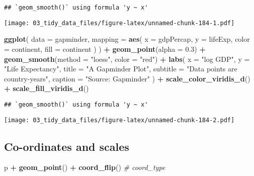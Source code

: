 \documentclass[
]{book}
\newenvironment{Shaded}{\begin{snugshade}}{\end{snugshade}}
\newcommand{\CommentTok}[1]{\textcolor[rgb]{0.56,0.35,0.01}{\textit{#1}}}
\newcommand{\DataTypeTok}[1]{\textcolor[rgb]{0.13,0.29,0.53}{#1}}
\newcommand{\FloatTok}[1]{\textcolor[rgb]{0.00,0.00,0.81}{#1}}
\newcommand{\KeywordTok}[1]{\textcolor[rgb]{0.13,0.29,0.53}{\textbf{#1}}}
\newcommand{\NormalTok}[1]{#1}
\newcommand{\OperatorTok}[1]{\textcolor[rgb]{0.81,0.36,0.00}{\textbf{#1}}}
\newcommand{\StringTok}[1]{\textcolor[rgb]{0.31,0.60,0.02}{#1}}
\begin{document}
\begin{verbatim}
## `geom_smooth()` using formula 'y ~ x'
\end{verbatim}

\texttt{[image: 03\_tidy\_data\_files/figure-latex/unnamed-chunk-184-1.pdf]}

\begin{Shaded}
\begin{Highlighting}[]
\KeywordTok{ggplot}\NormalTok{(}
  \DataTypeTok{data =}\NormalTok{ gapminder,}
  \DataTypeTok{mapping =} \KeywordTok{aes}\NormalTok{(}
    \DataTypeTok{x =}\NormalTok{ gdpPercap, }\DataTypeTok{y =}\NormalTok{ lifeExp,}
    \DataTypeTok{color =}\NormalTok{ continent,}
    \DataTypeTok{fill =}\NormalTok{ continent}
\NormalTok{  )}
\NormalTok{) }\OperatorTok{+}
\StringTok{  }\KeywordTok{geom\_point}\NormalTok{(}\DataTypeTok{alpha =} \FloatTok{0.3}\NormalTok{) }\OperatorTok{+}
\StringTok{  }\KeywordTok{geom\_smooth}\NormalTok{(}\DataTypeTok{method =} \StringTok{"loess"}\NormalTok{, }\DataTypeTok{color =} \StringTok{"red"}\NormalTok{) }\OperatorTok{+}
\StringTok{  }\KeywordTok{labs}\NormalTok{(}
    \DataTypeTok{x =} \StringTok{"log GDP"}\NormalTok{,}
    \DataTypeTok{y =} \StringTok{"Life Expectancy"}\NormalTok{,}
    \DataTypeTok{title =} \StringTok{"A Gapminder Plot"}\NormalTok{,}
    \DataTypeTok{subtitle =} \StringTok{"Data points are country{-}years"}\NormalTok{,}
    \DataTypeTok{caption =} \StringTok{"Source: Gapminder"}
\NormalTok{  ) }\OperatorTok{+}
\StringTok{  }\KeywordTok{scale\_color\_viridis\_d}\NormalTok{() }\OperatorTok{+}
\StringTok{  }\KeywordTok{scale\_fill\_viridis\_d}\NormalTok{()}
\end{Highlighting}
\end{Shaded}

\begin{verbatim}
## `geom_smooth()` using formula 'y ~ x'
\end{verbatim}

\texttt{[image: 03\_tidy\_data\_files/figure-latex/unnamed-chunk-184-2.pdf]}

\hypertarget{co-ordinates-and-scales}{%
\subsection{Co-ordinates and scales}\label{co-ordinates-and-scales}}

\begin{Shaded}
\begin{Highlighting}[]
\NormalTok{p }\OperatorTok{+}\StringTok{ }\KeywordTok{geom\_point}\NormalTok{() }\OperatorTok{+}
\StringTok{  }\KeywordTok{coord\_flip}\NormalTok{() }\CommentTok{\# coord\_type}
\end{Highlighting}
\end{Shaded}
\end{document}
